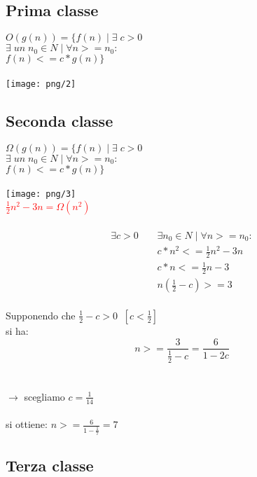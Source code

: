 \documentclass[12pt, letterpaper]{article}
\begin{document}
\subsection{Prima classe}
$O(g(n)) = \{f(n)\;|\; \exists \; c > 0$\\
$\exists \;un\; n_0 \in N \;|\; \forall n >= n_0 :$\\
$f(n) <= c * g(n)\}$
\\
\\
\texttt{[image: png/2]}

\subsection{Seconda classe}
$\Omega(g(n)) = \{f(n)\; | \; \exists \; c > 0$\\
$\exists \; un \; n_0 \in N \; | \; \forall n >= n_0 :$\\
$f(n) <= c * g(n)\}$\\
\\
\texttt{[image: png/3]}
\\
\textcolor{red}{$\frac{1}{2}n^2 - 3n = \Omega(n^2)$}
\\
\\
\[\begin{split}
   \exists  c > 0 \;\;\;\;& \exists n_0 \in N \;|\; \forall n >= n_0 :\\
      & c * n^2 <= \frac{1}{2}n^2 - 3n\\
      & c * n <= \frac{1}{2}n - 3\\
      & n(\frac{1}{2} - c) >= 3
\end{split}\]
\\
Supponendo che $\frac{1}{2} - c > 0 \;\; [c < \frac{1}{2}]$\\
si ha:
\\
\[n >=  \frac{3}{\frac{1}{2}-c} = \frac{6}{1-2c}\]
\\
\\
$\rightarrow$ scegliamo $c = \frac{1}{14}$\\\\
si ottiene: $n >= \frac{6}{1-\frac{1}{7}} = 7$

\subsection{Terza classe}
\end{document}
